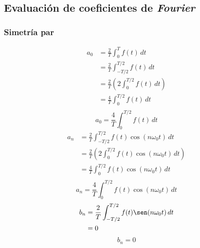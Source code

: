 \subsection{Evaluación de coeficientes de \emph{Fourier}}
\subsubsection{Simetría par}
\begin{equation*}
\begin{split}
    a_0
        &=\frac{2}{T}\int_0^T f(t)\,dt\\
        &=\frac{2}{T}\int_{-T/2}^{T/2} f(t)\,dt\\
        &=\frac{2}{T}\left(2\int_0^{T/2} f(t)\,dt\right)\\
        &=\frac{4}{T}\int_0^{T/2} f(t)\,dt\\
\end{split}
\end{equation*}
\begin{equation}
    a_0=\frac{4}{T}\int_0^{T/2} f(t)\,dt
\end{equation}
\begin{equation*}
\begin{split}
    a_n
        &=\frac{2}{T}\int_{-T/2}^{T/2} f(t)\cos(n\omega_0 t)\,dt\\
        &=\frac{2}{T}\left(2\int_0^{T/2} f(t)\cos(n\omega_0 t)\,dt\right)\\
        &=\frac{4}{T}\int_0^{T/2}f(t)\cos(n\omega_0 t)\,dt\\
\end{split}
\end{equation*}
\begin{equation}
    a_n=\frac{4}{T}\int_0^{T/2}f(t)\cos(n\omega_0 t)\,dt
\end{equation}
\begin{equation*}
\begin{split}
    b_n
        &=\frac{2}{T}\int_{-T/2}^{T/2} f(t)\sen(n\omega_0 t)\,dt\\
        &=0\\
\end{split}
\end{equation*}
\begin{equation}
    b_n=0
\end{equation}

